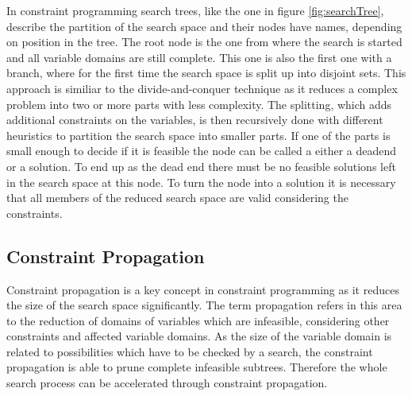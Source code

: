 \documentclass[10pt,
               a4paper,
               journal,
               ]{IEEEtran}
\newcommand{\reffig}[1]{{figure \ref{#1}}}
\begin{document}
	In constraint programming search trees, like the one in \reffig{fig:searchTree}, describe the partition of the search space and their nodes have names, depending on position in the tree. The root node is the one from where the search is started and all variable domains are still complete. This one is also the first one with a branch, where for the first time the search space is split up into disjoint sets. This approach is similiar to the divide-and-conquer technique as it reduces a complex problem into two or more parts with less complexity. The splitting, which adds additional constraints on the variables, is then recursively done with different heuristics to partition the search space into smaller parts. If one of the parts is small enough to decide if it is feasible the node can be called a either a deadend or a solution. To end up as the dead end there must be no feasible solutions left in the search space at this node. To turn the node into a solution it is necessary that all members of the reduced search space are valid considering the constraints.
	
	\subsection{Constraint Propagation}
	Constraint propagation is a key concept in constraint programming as it reduces the size of the search space significantly. The term propagation refers in this area to the reduction of domains of variables which are infeasible, considering other constraints and affected variable domains. As the size of the variable domain is related to possibilities which have to be checked by a search, the constraint propagation is able to prune complete infeasible subtrees. Therefore the whole search process can be accelerated through constraint propagation.
	
\end{document}
